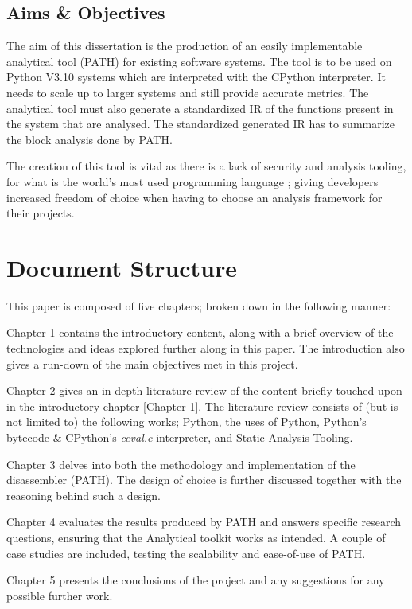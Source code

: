         \subsection{Aims \& Objectives}
        \par The aim of this dissertation is the production of an easily implementable analytical tool (\acs{PATH}) for existing software systems.
        The tool is to be used on Python V3.10 \cite[]{van2021python} systems which are interpreted with the CPython \cite[]{van2021python} interpreter. It needs 
        to scale up to larger systems and still provide accurate metrics. The analytical tool must also generate a standardized IR of the functions 
        present in the system that are analysed. The standardized generated IR has to summarize the block analysis done by \acs{PATH}. 
        \par The creation of this tool is vital as there is a lack of security and analysis tooling, for what is the world's most used programming language 
        \cite[]{tiobe2022index}; giving developers increased freedom of choice when having to choose an analysis framework for their projects.
        
    \section{Document Structure}
    This paper is composed of five chapters; broken down in the following manner:
   \par Chapter 1 contains the introductory content, along with a brief overview of the technologies and ideas explored further
    along in this paper. The introduction also gives a run-down of the main objectives met in this project.
    \par Chapter 2 gives an in-depth literature review of the content briefly touched upon in the introductory chapter [Chapter 1]. The literature review
    consists of (but is not limited to) the following works; Python, the uses of Python, Python's bytecode \& CPython's \textit{ceval.c} interpreter, and Static Analysis Tooling.  
    \par Chapter 3 delves into both the methodology and implementation of the disassembler (\acs{PATH}). The design of choice is further discussed together with the reasoning behind such a design.
    \par Chapter 4 evaluates the results produced by \acs{PATH} and answers specific research questions, ensuring that the Analytical toolkit works as intended. A couple of case studies are included,
    testing the scalability and ease-of-use of \acs{PATH}.
    \par Chapter 5 presents the conclusions of the project and any suggestions for any possible further work.

